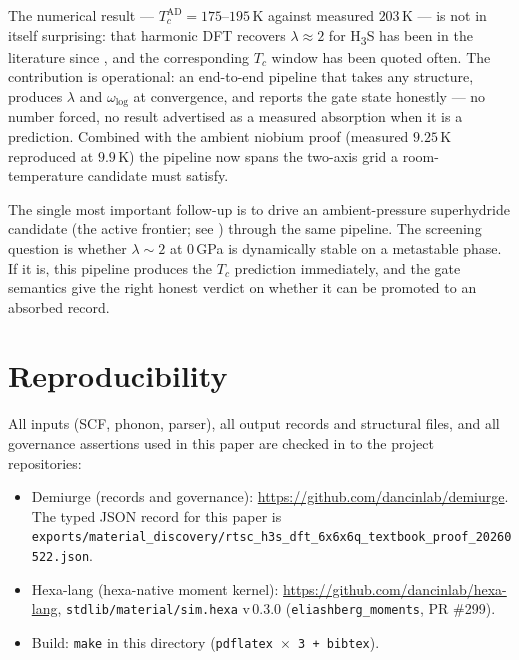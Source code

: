 \documentclass[11pt,a4paper]{article}
\begin{document}
The numerical result --- $T_c^{\text{AD}} = 175$--$195$\,K against measured
$203$\,K --- is not in itself surprising: that harmonic DFT recovers
$\lambda \approx 2$ for H\textsubscript{3}S has been in the literature since
\cite{errea2016h3s}, and the corresponding $T_c$ window has been quoted often.
The contribution is operational: an end-to-end pipeline that takes any structure,
produces $\lambda$ and $\omega_{\log}$ at convergence, and reports the gate
state honestly --- no number forced, no result advertised as a measured
absorption when it is a prediction. Combined with the ambient niobium proof
(measured $9.25$\,K reproduced at $9.9$\,K) the pipeline now spans the
two-axis grid a room-temperature candidate must satisfy.

The single most important follow-up is to drive an ambient-pressure
superhydride candidate (the active frontier; see \cite{ambient_hydride_2024_1,
ambient_hydride_2024_2}) through the same pipeline. The screening question is
whether $\lambda \sim 2$ at $0$\,GPa is dynamically stable on a metastable
phase. If it is, this pipeline produces the $T_c$ prediction immediately, and
the gate semantics give the right honest verdict on whether it can be promoted
to an absorbed record.

\section*{Reproducibility}

All inputs (SCF, phonon, parser), all output records and structural files, and
all governance assertions used in this paper are checked in to the project
repositories:
\begin{itemize}\itemsep0.2em
\item Demiurge (records and governance): \url{https://github.com/dancinlab/demiurge}.
  The typed JSON record for this paper is
  \texttt{exports/material\_discovery/rtsc\_h3s\_dft\_6x6x6q\_textbook\_proof\_20260522.json}.
\item Hexa-lang (hexa-native moment kernel): \url{https://github.com/dancinlab/hexa-lang},
  \texttt{stdlib/material/sim.hexa} v\,0.3.0 (\texttt{eliashberg\_moments}, PR \#299).
\item Build: \texttt{make} in this directory (\texttt{pdflatex $\times$ 3 + bibtex}).
\end{itemize}



\end{document}
